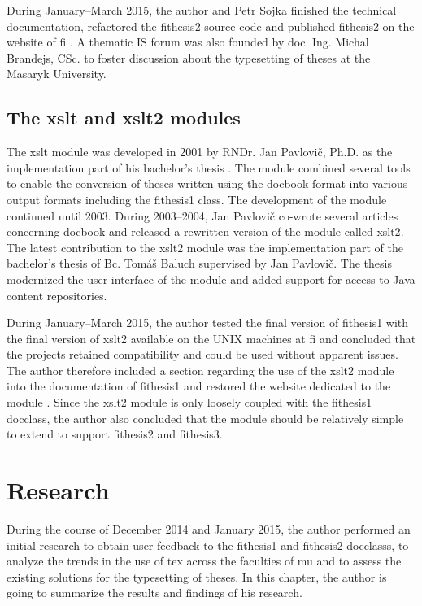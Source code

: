 \documentclass[12pt,twoside,cover,color,table]%
  {fithesis3/fithesis3/fithesis3} %
\begin{document}
  During January--March 2015, the author and Petr Sojka finished
  the technical documentation, refactored the \textsf{fithesis2}
  source code and published \textsf{fithesis2} on the website of
  \gls{fi} \cite{fithesisWeb}. A thematic IS forum
  \cite{fithesisForum} was also founded by doc. Ing. Michal
  Brandejs, CSc. to foster discussion about the typesetting of
  theses at the Masaryk University.

  \section{The \textsf{xslt} and \textsf{xslt2} modules}
  \label{sec:xslt}
  The \textsf{xslt} module was developed in 2001 by RNDr. Jan
  Pavlovič, Ph.D. as the implementation part of his bachelor's
  thesis \cite{PavlovicO1}. The module combined several tools to
  enable the conversion of theses written using the \gls{docbook}
  format into various output formats including the
  \textsf{fithesis1} class.  The development of the module
  continued until 2003. During 2003--2004, Jan Pavlovič co-wrote
  several articles concerning \gls{docbook} \cite{Pavlovic03,
  PitPav03, PitPav04} and released a rewritten version of the
  module called \textsf{xslt2}. The latest contribution to the
  \textsf{xslt2} module was the implementation part of the
  bachelor's thesis of Bc. Tomáš Baluch \cite{Baluch09} supervised
  by Jan Pavlovič. The thesis modernized the user interface of the
  module and added support for access to Java content repositories.

  During January--March 2015, the author tested the final version
  of \textsf{fithesis1} with the final version of \textsf{xslt2}
  available on the UNIX machines at \gls{fi} and concluded that the
  projects retained compatibility and could be used without
  apparent issues. The author therefore included a section
  regarding the use of the \textsf{xslt2} module into the
  documentation of \textsf{fithesis1} and restored the website
  dedicated to the module \cite{xslt2web}. Since the \textsf{xslt2}
  module is only loosely coupled with the \textsf{fithesis1}
  \gls{docclass}, the author also concluded that the module should
  be relatively simple to extend to support \textsf{fithesis2} and
  \textsf{fithesis3}.

\chapter{Research}
  During the course of December 2014 and January 2015, the author
  performed an initial research to obtain user feedback to the
  \textsf{fithesis1} and \textsf{fithesis2} \glspl{docclass}, to
  analyze the trends in the use of \gls{tex} across the faculties
  of \gls{mu} and to assess the existing solutions for the
  typesetting of theses. In this chapter, the author is going to
  summarize the results and findings of his research.
\end{document}
